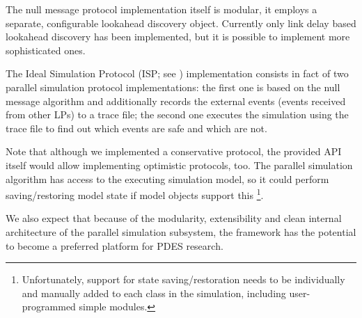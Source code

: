 The null message protocol implementation itself is modular,
it employs a separate, configurable lookahead discovery object.
Currently only link delay based lookahead discovery has been
implemented, but it is possible to implement more sophisticated
ones.

The Ideal Simulation Protocol (ISP; see \cite{bagrodia00})
implementation consists in fact of two parallel simulation
protocol implementations:
the first one is based on the null message algorithm and
additionally records the external events (events received
from other LPs) to a trace file; the second one executes
the simulation using the trace file to find out which
events are safe and which are not.

Note that although we implemented a conservative protocol,
the provided API itself would allow implementing optimistic
protocols, too. The parallel simulation algorithm has
access to the executing simulation model, so it could perform
saving/restoring model state if model objects support this
  \footnote{Unfortunately, support for state saving/restoration
  needs to be individually and manually added to each class
  in the simulation, including user-programmed simple modules.}.

We also expect that because of the modularity, extensibility and
clean internal architecture of the parallel simulation subsystem,
the {\opp} framework has the potential to become a preferred platform
for PDES research.



